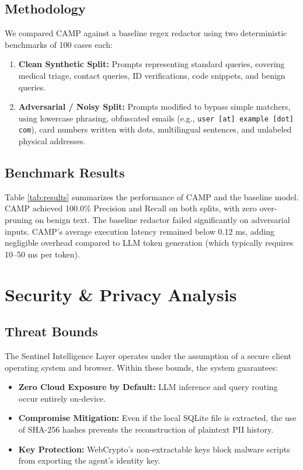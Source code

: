 \documentclass[conference]{IEEEtran}
\begin{document}
\subsection{Methodology}
We compared CAMP against a baseline regex redactor using two deterministic benchmarks of 100 cases each:
\begin{enumerate}
    \item \textbf{Clean Synthetic Split:} Prompts representing standard queries, covering medical triage, contact queries, ID verifications, code snippets, and benign queries.
    \item \textbf{Adversarial / Noisy Split:} Prompts modified to bypass simple matchers, using lowercase phrasing, obfuscated emails (e.g., \texttt{user [at] example [dot] com}), card numbers written with dots, multilingual sentences, and unlabeled physical addresses.
\end{enumerate}

\subsection{Benchmark Results}

Table \ref{tab:results} summarizes the performance of CAMP and the baseline model. CAMP achieved 100.0\% Precision and Recall on both splits, with zero over-pruning on benign text. The baseline redactor failed significantly on adversarial inputs. CAMP's average execution latency remained below 0.12 ms, adding negligible overhead compared to LLM token generation (which typically requires 10--50 ms per token).

\section{Security \& Privacy Analysis}

\subsection{Threat Bounds}
The Sentinel Intelligence Layer operates under the assumption of a secure client operating system and browser. Within these bounds, the system guarantees:
\begin{itemize}
    \item \textbf{Zero Cloud Exposure by Default:} LLM inference and query routing occur entirely on-device.
    \item \textbf{Compromise Mitigation:} Even if the local SQLite file is extracted, the use of SHA-256 hashes prevents the reconstruction of plaintext PII history.
    \item \textbf{Key Protection:} WebCrypto's non-extractable keys block malware scripts from exporting the agent's identity key.
\end{itemize}
\end{document}
